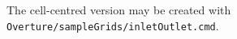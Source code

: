 \documentclass[xcolor=rgb,svgnames,dvipsnames]{article}
\newcommand{\sampleGrids}{Overture/sampleGrids}
\newcommand{\figures}{\homeHenshaw/OvertureFigures}
\begin{document}
The cell-centred version may be created with {\tt \sampleGrids/inletOutlet.cmd}.

\clearpage
\end{document}
